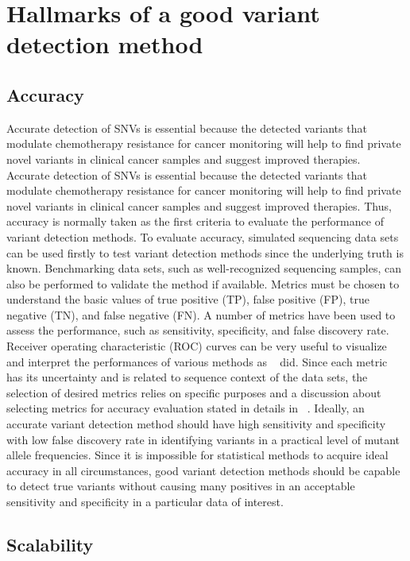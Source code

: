 \documentclass[11pt,reqno]{amsart}
\begin{document}
\section{Hallmarks of a good variant detection method}

\subsection{Accuracy}
Accurate detection of SNVs is essential because the detected variants that modulate chemotherapy resistance for cancer monitoring will help to find private novel variants in clinical cancer samples and suggest improved therapies.
Accurate detection of SNVs is essential because the detected variants that modulate chemotherapy resistance for cancer monitoring will help to find private novel variants in clinical cancer samples and suggest improved therapies.
Thus, accuracy is normally taken as the first criteria to evaluate the performance of variant detection methods.
To evaluate accuracy, simulated sequencing data sets can be used firstly to test variant detection methods since the underlying truth is known.
Benchmarking data sets, such as well-recognized sequencing samples, can also be performed to validate the method if available.
Metrics must be chosen to understand the basic values of true positive (TP), false positive (FP), true negative (TN), and false negative (FN).
A number of metrics have been used to assess the performance, such as sensitivity, specificity, and false discovery rate.
Receiver operating characteristic (ROC) curves can be very useful to visualize and interpret the performances of various methods as ~\citep{Xu2014, Huang2015, He2015} did.
Since each metric has its uncertainty and is related to sequence context of the data sets, the selection of desired metrics relies on specific purposes and a discussion about selecting metrics for accuracy evaluation stated in details in ~\citep{Olson2015}.
Ideally, an accurate variant detection method should have high sensitivity and specificity with low false discovery rate in identifying variants in a practical level of mutant allele frequencies.
Since it is impossible for statistical methods to acquire ideal accuracy in all circumstances, good variant detection methods should be capable to detect true variants without causing many positives in an acceptable sensitivity and specificity in a particular data of interest.


\subsection{Scalability}
\end{document}
